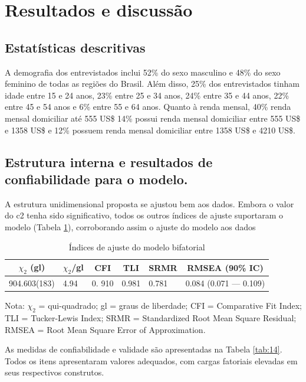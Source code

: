 \section{Resultados e discussão}
\subsection{Estatísticas descritivas}

A demografia dos entrevistados inclui 52\% do sexo masculino e 48\% do sexo feminino de todas as regiões do Brasil. Além disso, 25\% dos entrevistados tinham idade entre 15 e 24 anos, 23\% entre 25 e 34 anos, 24\% entre 35 e 44 anos, 22\% entre 45 e 54 anos e 6\% entre 55 e 64 anos. Quanto à renda mensal, 40\% renda mensal domiciliar até 555 US\$ 14\% possui renda mensal domiciliar entre 555 US\$ e 1358 US\$ e 12\% possuem renda mensal domiciliar entre 1358 US\$ e 4210 US\$.

\subsection{Estrutura interna e resultados de confiabilidade para o modelo.}

A estrutura unidimensional proposta se ajustou bem aos dados. Embora o valor do c2 tenha sido significativo, todos os outros índices de ajuste suportaram o modelo (Tabela \ref{tab:13}), corroborando assim o ajuste do modelo aos dados \cite{Steiger2010StructuralApproach,Bagozzi2016StateUsage}

\begin{table}[H]
\centering
\caption{Índices de ajuste do modelo bifatorial}
\label{tab:13}
\begin{tabular}{llllll}
\hline
\multicolumn{1}{c}{$\chi_2$ (gl)} &
  \multicolumn{1}{c}{$\chi_2$/gl} &
  \multicolumn{1}{c}{CFI} &
  \multicolumn{1}{c}{TLI} &
  \multicolumn{1}{c}{SRMR} &
  \multicolumn{1}{c}{RMSEA (90\% IC)} \\ \hline
904.603(183) &
  4.94 &
  0. 910 &
  0.981 &
  0.781 &
  0.084 (0.071 — 0.109) \\ \hline
\end{tabular}

\footnotesize{Nota: $\chi_2$ = qui-quadrado; gl = graus de liberdade; CFI = Comparative Fit Index; TLI = Tucker-Lewis Index; SRMR = Standardized Root Mean Square Residual; RMSEA = Root Mean Square Error of Approximation.}
\end{table}

As medidas de confiabilidade e validade são apresentadas na Tabela \ref{tab:14}. Todos os itens apresentaram valores adequados, com cargas fatoriais elevadas em seus respectivos construtos.

